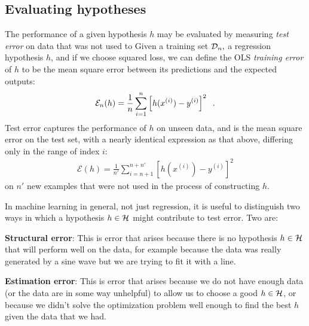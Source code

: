 \subsection{Evaluating hypotheses}

The performance of a given hypothesis $h$ may be evaluated by
measuring {\em test error} on data that was not used to
%
%
Given a training set ${\cal D}_n,$ a regression hypothesis $h$, and if we choose squared loss, we can define the OLS {\em{training error}} of $h$ to be the mean square error between its predictions and the expected outputs:
\begin{eqnarray*}
  \mathcal{E}_n(h) = \frac{1}{n}\sum_{i = 1}^{n} \left[ h(x^{(i)}) - y^{(i)} \right]^2
  \;\;.
\end{eqnarray*}
Test error captures the performance of $h$ on unseen data, and is the
mean square error on the test set, with a nearly identical expression
as that above, differing only in the range of index $i$:
\begin{eqnarray*}
  \mathcal{E}(h) = \frac{1}{n'}\sum_{i = n + 1}^{n + n'} \left[ h(x^{(i)}) - y^{(i)} \right]^2
\end{eqnarray*}
on $n'$ new examples that were not used in the process of constructing $h$.

In machine learning in general, not just regression, it is useful to
distinguish two ways in which a hypothesis $h \in {\cal H}$ might
contribute to test error. Two are:
\begin{description}
  \item{\bf Structural error}: This is error that arises because there
        is no hypothesis $h \in {\cal H}$ that will perform well on the data,
        for example because the data was really generated by a sine wave but
        we are trying to fit it with a line.
  \item{\bf Estimation  error}:  This is error that arises because we
        do not have enough data (or the data are in some way unhelpful) to
        allow us to choose a good $h \in {\cal H}$, or because we didn't
        solve the optimization problem well enough to find the best $h$
        given the data that we had.
\end{description}

